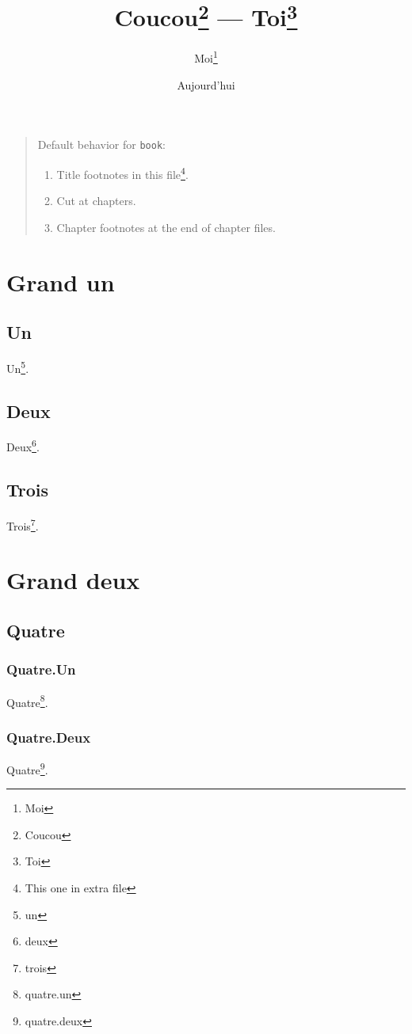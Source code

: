 \documentclass{book}
\begin{document}
\title{Coucou\footnote{Coucou} --- Toi\footnote{Toi}}
\author{Moi\thanks{Moi}}
\date{Aujourd'hui}
\maketitle
\begin{quote}
Default \hacha{} behavior for \texttt{book}:
\begin{enumerate}
\item Title footnotes in this file\footnote{This one in extra file}.
\item Cut at chapters.
\item Chapter footnotes at the end of chapter files.
\end{enumerate}
\end{quote}
\tableofcontents
\part{Grand un}
\chapter{Un}
Un\footnote{un}.
\chapter{Deux}
Deux\footnote{deux}.
\chapter{Trois}
Trois\footnote{trois}.
\part{Grand deux}
\chapter{Quatre}
\section{Quatre.Un}
Quatre\footnote{quatre.un}.
\section{Quatre.Deux}
Quatre\footnote{quatre.deux}.
\end{document}
